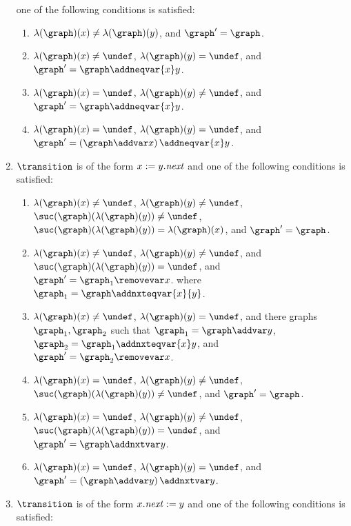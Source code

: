 \begin{enumerate}
one of the following conditions is satisfied:
\begin{enumerate}
\item
$\labeling(\graph)(\xvar)\neq\labeling(\graph)(\yvar)$, and 
$\graph'=\graph$.
\item
$\labeling(\graph)(\xvar)\neq\undef$, $\labeling(\graph)(\yvar)=\undef$, and
$\graph'=\graph\addneqvar{\xvar}\yvar$.
\item
$\labeling(\graph)(\xvar)=\undef$, $\labeling(\graph)(\yvar)\neq\undef$, and
$\graph'=\graph\addneqvar{\xvar}\yvar$.
\item
$\labeling(\graph)(\xvar)=\undef$, $\labeling(\graph)(\yvar)=\undef$, and
$\graph'=\left(\graph\addvar\xvar\right)\addneqvar{\xvar}\yvar$.
\end{enumerate}
\item
$\transition$ is of the form $x:=y.{\it next}$ and
one of the following conditions is satisfied:
\begin{enumerate}
\item
$\labeling(\graph)(\xvar)\neq\undef$,
$\labeling(\graph)(\yvar)\neq\undef$,
$\suc(\graph)(\labeling(\graph)(\yvar))\neq\undef$,
$\suc(\graph)(\labeling(\graph)(\yvar))=\labeling(\graph)(\xvar)$,
and
$\graph'=\graph$.
\item
$\labeling(\graph)(\xvar)\neq\undef$,
$\labeling(\graph)(\yvar)\neq\undef$, and
$\suc(\graph)(\labeling(\graph)(\yvar))=\undef$,
and
$\graph'=\graph_1\removevar\xvar$.
where
$\graph_1=\graph\addnxteqvar{\xvar}{\yvar}$.
\item
$\labeling(\graph)(\xvar)\neq\undef$,
$\labeling(\graph)(\yvar)=\undef$,
and there graphs $\graph_1,\graph_2$ such that
$\graph_1=\graph\addvar\yvar$,
$\graph_2=\graph_1\addnxteqvar{\xvar}\yvar$, and
$\graph'=\graph_2\removevar\xvar$.
\item
$\labeling(\graph)(\xvar)=\undef$,
$\labeling(\graph)(\yvar)\neq\undef$,
$\suc(\graph)(\labeling(\graph)(\yvar))\neq\undef$, and
$\graph'=\graph$.
\item
$\labeling(\graph)(\xvar)=\undef$,
$\labeling(\graph)(\yvar)\neq\undef$,
$\suc(\graph)(\labeling(\graph)(\yvar))=\undef$, and
$\graph'=\graph\addnxtvar\yvar$.
\item
$\labeling(\graph)(\xvar)=\undef$,
$\labeling(\graph)(\yvar)=\undef$,
and 
$\graph'=\left(\graph\addvar\yvar\right)\addnxtvar\yvar$.
\end{enumerate}
\item
$\transition$ is of the form $x.{\it next}:=y$ and
one of the following conditions is satisfied:
\begin{enumerate}

\end{enumerate}
\end{enumerate}
